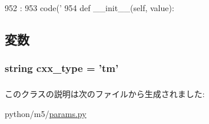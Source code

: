 \begin{DoxyCode}
952                                 :
953         code('%
954 
    def __init__(self, value):
\end{DoxyCode}


\subsection{変数}
\hypertarget{classm5_1_1params_1_1Time_a2f1553ebb79374a68b36fdd6d8d82fc3}{
\subsubsection[{cxx\_\-type}]{\setlength{\rightskip}{0pt plus 5cm}string {\bf cxx\_\-type} = 'tm'}}
\label{classm5_1_1params_1_1Time_a2f1553ebb79374a68b36fdd6d8d82fc3}
\hypertarget{classm5_1_1params_1_1Time_afcc7a4b78ecd8fa7e713f8cfa0f51017}{
\subsubsection[{value}]{}}
\label{classm5_1_1params_1_1Time_afcc7a4b78ecd8fa7e713f8cfa0f51017}


このクラスの説明は次のファイルから生成されました:\begin{DoxyCompactItemize}
\item 
python/m5/\hyperlink{params_8py}{params.py}\end{DoxyCompactItemize}
